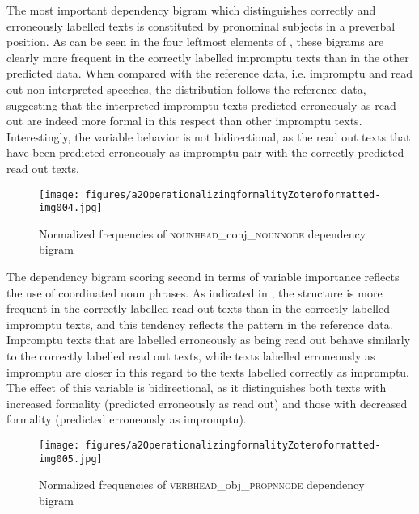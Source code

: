 \documentclass[output=paper]{langscibook}
\begin{document}
The most important dependency bigram which distinguishes correctly and erroneously labelled texts is constituted by pronominal subjects in a preverbal position. As can be seen in the four leftmost elements of , these bigrams are clearly more frequent in the correctly labelled impromptu texts than in the other predicted data. When compared with the reference data, i.e. impromptu and read out non-interpreted speeches, the distribution follows the reference data, suggesting that the interpreted impromptu texts predicted erroneously as read out are indeed more formal in this respect than other impromptu texts. Interestingly, the variable behavior is not bidirectional, as the read out texts that have been predicted erroneously as impromptu pair with the correctly predicted read out texts.

\begin{figure} 
\texttt{[image: figures/a2OperationalizingformalityZoteroformatted-img004.jpg]}
 
\caption{Normalized frequencies of \textsc{nounhead}\_conj\_\textsc{nounnode} dependency bigram}
\label{fig:ivaska:4}
\end{figure}

The dependency bigram scoring second in terms of variable importance reflects the use of coordinated noun phrases. As indicated in , the structure is more frequent in the correctly labelled read out texts than in the correctly labelled impromptu texts, and this tendency reflects the pattern in the reference data. Impromptu texts that are labelled erroneously as being read out behave similarly to the correctly labelled read out texts, while texts labelled erroneously as impromptu are closer in this regard to the texts labelled correctly as impromptu. The effect of this variable is bidirectional, as it distinguishes both texts with increased formality (predicted erroneously as read out) and those with decreased formality (predicted erroneously as impromptu).

\begin{figure}

\texttt{[image: figures/a2OperationalizingformalityZoteroformatted-img005.jpg]}
 
\caption{Normalized frequencies of \textsc{verbhead}\_obj\_\textsc{propnnode} dependency bigram}
\label{fig:ivaska:5}
\end{figure}
\end{document}
